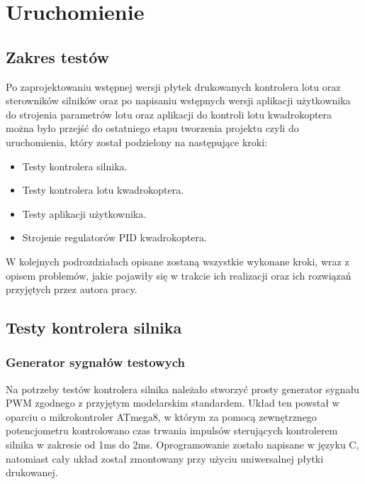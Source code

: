 
\chapter{Uruchomienie} %

\label{Chapter7} %


\section{Zakres testów}

Po zaprojektowaniu wstępnej wersji płytek drukowanych kontrolera lotu oraz sterowników silników oraz po napisaniu wstępnych wersji aplikacji użytkownika do strojenia parametrów lotu oraz aplikacji do kontroli lotu kwadrokoptera można było przejść do ostatniego etapu tworzenia projektu czyli do uruchomienia, który został podzielony na następujące kroki:

\begin{itemize}
	\item Testy kontrolera silnika.
	\item Testy kontrolera lotu kwadrokoptera.
	\item Testy aplikacji użytkownika.
	\item Strojenie regulatorów PID kwadrokoptera.
\end{itemize} 

W kolejnych podrozdziałach opisane zostaną wszystkie wykonane kroki, wraz z opisem problemów, jakie pojawiły się w trakcie ich realizacji oraz ich rozwiązań przyjętych przez autora pracy.

\section{Testy kontrolera silnika}

\subsection{Generator sygnałów testowych}

Na potrzeby testów kontrolera silnika należało stworzyć prosty generator sygnału PWM zgodnego z przyjętym modelarskim standardem. Układ ten powstał w oparciu o mikrokontroler ATmega8, w którym za pomocą zewnętrznego potencjometru kontrolowano czas trwania impulsów sterujących kontrolerem silnika w zakresie od 1ms do 2ms. Oprogramowanie zostało napisane w języku C, natomiast cały układ został zmontowany przy użyciu uniwersalnej płytki drukowanej.

